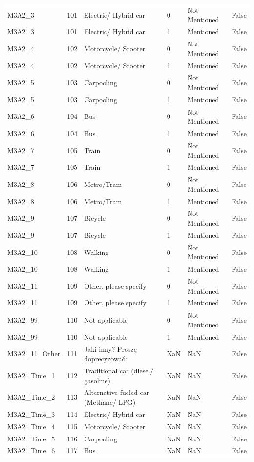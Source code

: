 \begin{tabular}{lrlllr}
M3A2_3 & 101 & Electric/ Hybrid car & 0 & Not Mentioned & False \\
M3A2_3 & 101 & Electric/ Hybrid car & 1 & Mentioned & False \\
M3A2_4 & 102 & Motorcycle/ Scooter & 0 & Not Mentioned & False \\
M3A2_4 & 102 & Motorcycle/ Scooter & 1 & Mentioned & False \\
M3A2_5 & 103 & Carpooling & 0 & Not Mentioned & False \\
M3A2_5 & 103 & Carpooling & 1 & Mentioned & False \\
M3A2_6 & 104 & Bus & 0 & Not Mentioned & False \\
M3A2_6 & 104 & Bus & 1 & Mentioned & False \\
M3A2_7 & 105 & Train & 0 & Not Mentioned & False \\
M3A2_7 & 105 & Train & 1 & Mentioned & False \\
M3A2_8 & 106 & Metro/Tram & 0 & Not Mentioned & False \\
M3A2_8 & 106 & Metro/Tram & 1 & Mentioned & False \\
M3A2_9 & 107 & Bicycle & 0 & Not Mentioned & False \\
M3A2_9 & 107 & Bicycle & 1 & Mentioned & False \\
M3A2_10 & 108 & Walking & 0 & Not Mentioned & False \\
M3A2_10 & 108 & Walking & 1 & Mentioned & False \\
M3A2_11 & 109 & Other, please specify & 0 & Not Mentioned & False \\
M3A2_11 & 109 & Other, please specify & 1 & Mentioned & False \\
M3A2_99 & 110 & Not applicable & 0 & Not Mentioned & False \\
M3A2_99 & 110 & Not applicable & 1 & Mentioned & False \\
M3A2_11_Other & 111 & Jaki inny? Proszę doprecyzować: & NaN & NaN & False \\
M3A2_Time_1 & 112 & Traditional car (diesel/ gasoline) & NaN & NaN & False \\
M3A2_Time_2 & 113 & Alternative fueled car (Methane/ LPG) & NaN & NaN & False \\
M3A2_Time_3 & 114 & Electric/ Hybrid car & NaN & NaN & False \\
M3A2_Time_4 & 115 & Motorcycle/ Scooter & NaN & NaN & False \\
M3A2_Time_5 & 116 & Carpooling & NaN & NaN & False \\
M3A2_Time_6 & 117 & Bus & NaN & NaN & False \\

\end{tabular}
